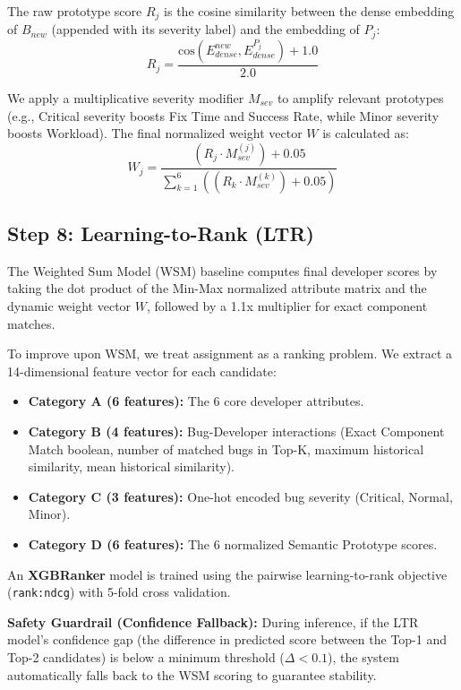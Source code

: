 \documentclass[conference]{IEEEtran}
\begin{document}
The raw prototype score $R_j$ is the cosine similarity between the dense embedding of $B_{new}$ (appended with its severity label) and the embedding of $P_j$:
\begin{equation}
R_j = \frac{\text{cos}(E_{dense}^{new}, E_{dense}^{P_j}) + 1.0}{2.0}
\end{equation}

We apply a multiplicative severity modifier $M_{sev}$ to amplify relevant prototypes (e.g., Critical severity boosts Fix Time and Success Rate, while Minor severity boosts Workload). The final normalized weight vector $W$ is calculated as:
\begin{equation}
W_j = \frac{(R_j \cdot M_{sev}^{(j)}) + 0.05}{\sum_{k=1}^{6} ((R_k \cdot M_{sev}^{(k)}) + 0.05)}
\end{equation}

\subsection{Step 8: Learning-to-Rank (LTR)}
The Weighted Sum Model (WSM) baseline computes final developer scores by taking the dot product of the Min-Max normalized attribute matrix and the dynamic weight vector $W$, followed by a 1.1x multiplier for exact component matches.

To improve upon WSM, we treat assignment as a ranking problem. We extract a 14-dimensional feature vector for each candidate:
\begin{itemize}
    \item \textbf{Category A (6 features):} The 6 core developer attributes.
    \item \textbf{Category B (4 features):} Bug-Developer interactions (Exact Component Match boolean, number of matched bugs in Top-K, maximum historical similarity, mean historical similarity).
    \item \textbf{Category C (3 features):} One-hot encoded bug severity (Critical, Normal, Minor).
    \item \textbf{Category D (6 features):} The 6 normalized Semantic Prototype scores.
\end{itemize}

An \textbf{XGBRanker} model is trained using the pairwise learning-to-rank objective (\texttt{rank:ndcg}) with 5-fold cross validation. 

\textbf{Safety Guardrail (Confidence Fallback):} During inference, if the LTR model's confidence gap (the difference in predicted score between the Top-1 and Top-2 candidates) is below a minimum threshold ($\Delta < 0.1$), the system automatically falls back to the WSM scoring to guarantee stability.
\end{document}
